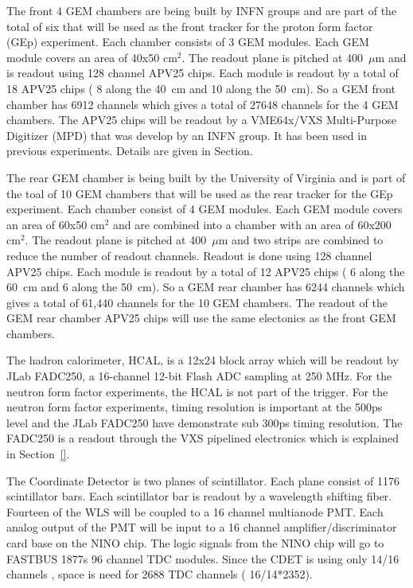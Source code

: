 \documentclass{article}
\begin{document}
The front 4 GEM chambers are being built by INFN groups and are part of the total of six that
will be used as the front tracker for the proton form factor (GEp) experiment. Each chamber consists
of 3 GEM modules. Each GEM module covers an area of 40x50 cm$^2$. The readout plane is pitched at 400~$\mu$m
and is readout using 128 channel APV25 chips. Each module is readout by a total of 18 APV25 chips ( 8 along
the 40~cm and 10 along the 50~cm). So a GEM front chamber has 6912 channels which gives a total of 27648 channels
for the 4 GEM chambers. The APV25 chips will be readout by a VME64x/VXS Multi-Purpose Digitizer (MPD) that was
develop by an INFN group. It has been used in previous experiments. Details are given in Section.

The rear GEM chamber is being built by the University of Virginia and is part of the toal of 10 GEM chambers
that will be used as the rear tracker for the GEp experiment. Each chamber consist of 4 GEM modules.
 Each GEM module covers an area of 60x50 cm$^2$ and are combined into a chamber with an area
of 60x200 cm$^2$. The readout plane is pitched at 400~$\mu$m and two strips are combined to reduce
the number of readout channels. Readout is done using 128 channel APV25 chips. Each module is readout 
by a total of  12 APV25 chips (  6 along the 60~cm and 6 along the 50~cm). So a GEM rear chamber has  
6244 channels which gives a total of 61,440 channels for the 10 GEM chambers. The readout of the GEM
rear chamber APV25 chips will use the same electonics as the front GEM chambers.  
 
The hadron calorimeter, HCAL, is a 12x24 block array which will be readout by JLab FADC250, a 16-channel 12-bit Flash 
ADC sampling at 250 MHz. For the neutron form factor experiments, the HCAL is not part of the trigger. For the
neutron form factor experiments, timing resolution is important at the 500ps level and the JLab FADC250 have 
demonstrate sub 300ps timing resolution. The FADC250 is a readout through the VXS pipelined electronics
which is explained in Section~\ref{}.

The Coordinate Detector is  two planes of scintillator. Each plane consist of 1176 scintillator bars. 
Each scintillator bar is readout by a wavelength shifting fiber. Fourteen of the WLS  will be coupled to
a 16 channel multianode PMT. Each analog output of the PMT will be input to a 16 channel amplifier/discriminator
card base on the NINO chip. The logic signals from the NINO chip will go to FASTBUS 1877s 96 channel TDC modules.
Since the CDET is using only 14/16 channels , space is need for 2688 TDC channels ( 16/14*2352).
 
\end{document}
